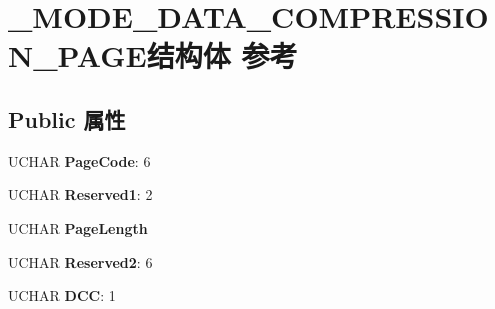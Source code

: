 \hypertarget{struct___m_o_d_e___d_a_t_a___c_o_m_p_r_e_s_s_i_o_n___p_a_g_e}{}\section{\+\_\+\+M\+O\+D\+E\+\_\+\+D\+A\+T\+A\+\_\+\+C\+O\+M\+P\+R\+E\+S\+S\+I\+O\+N\+\_\+\+P\+A\+G\+E结构体 参考}
\label{struct___m_o_d_e___d_a_t_a___c_o_m_p_r_e_s_s_i_o_n___p_a_g_e}
\subsection*{Public 属性}
\begin{DoxyCompactItemize}
\item 
\mbox{\label{struct___m_o_d_e___d_a_t_a___c_o_m_p_r_e_s_s_i_o_n___p_a_g_e_a60089fa0f6c81c3d05dc69ac3a7ce879}} 
U\+C\+H\+AR {\bfseries Page\+Code}\+: 6
\item 
\mbox{\label{struct___m_o_d_e___d_a_t_a___c_o_m_p_r_e_s_s_i_o_n___p_a_g_e_a25db9dfc7ebb44502a9447e283524fc9}} 
U\+C\+H\+AR {\bfseries Reserved1}\+: 2
\item 
\mbox{\label{struct___m_o_d_e___d_a_t_a___c_o_m_p_r_e_s_s_i_o_n___p_a_g_e_af59921b8b934f5aecfed9a16b665e3dd}} 
U\+C\+H\+AR {\bfseries Page\+Length}
\item 
\mbox{\label{struct___m_o_d_e___d_a_t_a___c_o_m_p_r_e_s_s_i_o_n___p_a_g_e_a819a064ea3880bd4442f30dcfe75ab00}} 
U\+C\+H\+AR {\bfseries Reserved2}\+: 6
\item 
\mbox{\label{struct___m_o_d_e___d_a_t_a___c_o_m_p_r_e_s_s_i_o_n___p_a_g_e_a81f82ab5e7698972d395414c348ac6f5}} 
U\+C\+H\+AR {\bfseries D\+CC}\+: 1
\item 
\mbox{\label{struct___m_o_d_e___d_a_t_a___c_o_m_p_r_e_s_s_i_o_n___p_a_g_e_aae4880d6d76b9136741069b1f4d8372d}} 

\end{DoxyCompactItemize}
